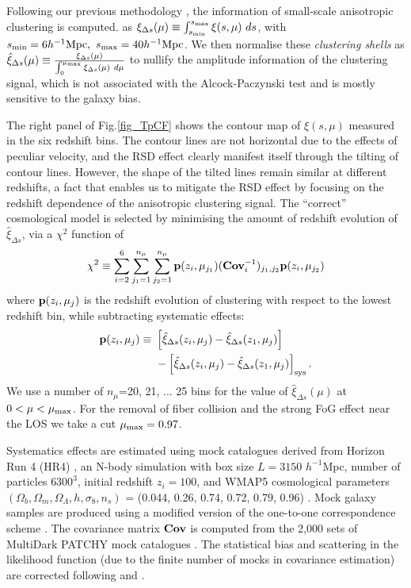 \documentclass{natureprintstyle}
\let\citep\cite
\let\citet\cite
\begin{document}
Following our previous methodology \citep{Li2016}, the information of small-scale anisotropic clustering is computed.
as $\xi_{\Delta s} (\mu) \equiv \int_{s_{\rm min}}^{s_{\rm max}} \xi (s,\mu)\ ds$, 
with $s_{\rm min}=6 h^{-1} {\rm Mpc},\ s_{\rm max}=40 h^{-1} {\rm Mpc}$.
We then normalise these {\em clustering shells} as 
$\hat\xi_{\Delta s}(\mu) \equiv \frac{\xi_{\Delta s}(\mu)}{\int_{0}^{\mu_{\rm max}}\xi_{\Delta s}(\mu)\ d\mu}$
to nullify the amplitude information of the clustering signal, 
which is not associated with the Alcock-Paczynski test and is mostly sensitive to the galaxy bias.

The right panel of Fig.\ref{fig_TpCF} shows the contour map of $\xi(s,\mu)$ measured in the six redshift bins.
The contour lines are not horizontal due to the effects of peculiar velocity,
and the RSD effect clearly manifest itself through the tilting of contour lines.
However, the shape of the tilted lines remain similar at different redshifts, a fact that enables us  to mitigate the RSD effect by focusing on the redshift dependence of the anisotropic clustering signal.
The ``correct'' cosmological model is selected by minimising the amount of redshift evolution of $\hat\xi_{\Delta s}$,
via a $\chi^2$ function of 
\begin{equation}
 \chi^2\equiv \sum_{i=2}^{6} \sum_{j_1=1}^{n_{\mu}} \sum_{j_2=1}^{n_{\mu}} {\bf p}(z_i,\mu_{j_1}) ({\bf Cov}_{i}^{-1})_{j_1,j_2}  {\bf p}(z_i,\mu_{j_2})
\end{equation}
where ${\bf p}(z_i,\mu_{j})$ is the redshift evolution of clustering with respect to the lowest redshift bin,
while subtracting systematic effects:
\begin{eqnarray}
 {\bf p}(z_i,\mu_{j}) \equiv\ & \left[\hat\xi_{\Delta s}(z_i,\mu_j)-\hat\xi_{\Delta s}(z_1,\mu_j)\right] \\ \nonumber
 &- \left[\hat\xi_{\Delta s}(z_i,\mu_j)-\hat\xi_{\Delta s}(z_1,\mu_j)\right]_{\rm sys}.
\end{eqnarray}
We use a number of $n_{\mu}$=20, 21, ... 25 bins for the value of $\hat\xi_{\Delta s}(\mu)$ at $0<\mu<\mu_{\rm max}$.
For the removal of fiber collision and the strong FoG effect near the LOS we take a cut $\mu_{\rm max} = 0.97$.

Systematics effects are estimated using mock catalogues derived from Horizon Run 4 (HR4) \cite{HR4},
an N-body simulation with box size $L={3150}$ $h^{-1}$Mpc, number of particles $6300^3$,   
initial redshift $z_{i}=100$, and WMAP5 cosmological parameters 
$(\Omega_{b},\Omega_{m},\Omega_\Lambda,h,\sigma_8,n_s)$  = (0.044, 0.26, 0.74, 0.72, 0.79, 0.96) \citep[]{komatsu 2011}. 
Mock galaxy samples are produced using a modified version of the one-to-one correspondence scheme \citep{hong2016}. 
The covariance matrix ${\bf Cov}$ is computed from the 2,000 sets of MultiDark PATCHY mock catalogues \citep{MDPATCHY}.
The statistical bias and scattering in the likelihood function (due to the finite number of mocks in covariance estimation) 
are corrected following \citet{Hartlap} and \citet{Percival2014}.
\end{document}
